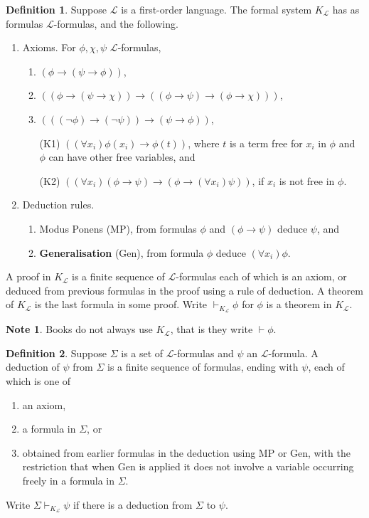\documentclass{article}
\newcommand{\rb}[1]{\left( #1 \right)}
\newcommand{\notb}[1]{\rb{\neg #1}}
\newcommand{\impb}[2]{\rb{#1 \rightarrow #2}}
\newcommand{\fab}[1]{\rb{\forall #1}}
\theoremstyle{definition}\newtheorem{definition}{Definition}[subsection]
\theoremstyle{definition}\newtheorem{remark}[definition]{Remark}
\theoremstyle{definition}\newtheorem*{example}{Example}
\theoremstyle{definition}\newtheorem*{note}{Note}
\begin{document}
\begin{definition}
Suppose $ \mathcal{L} $ is a first-order language. The formal system \textbf{$ K_\mathcal{L} $} has as formulas $ \mathcal{L} $-formulas, and the following.
\begin{enumerate}
\item Axioms. For $ \phi, \chi, \psi $ $ \mathcal{L} $-formulas,
\begin{enumerate}[label=(A\arabic*)]
\item $ \impb{\phi}{\impb{\psi}{\phi}} $,
\item $ \impb{\impb{\phi}{\impb{\psi}{\chi}}}{\impb{\impb{\phi}{\psi}}{\impb{\phi}{\chi}}} $,
\item $ \impb{\impb{\notb{\phi}}{\notb{\psi}}}{\impb{\psi}{\phi}} $,
\item[(K1)] $ \impb{\fab{x_i}\phi\rb{x_i}}{\phi\rb{t}} $, where $ t $ is a term free for $ x_i $ in $ \phi $ and $ \phi $ can have other free variables, and
\item[(K2)] $ \impb{\fab{x_i}\impb{\phi}{\psi}}{\impb{\phi}{\fab{x_i}\psi}} $, if $ x_i $ is not free in $ \phi $.
\end{enumerate}
\item Deduction rules.
\begin{enumerate}
\item Modus Ponens (MP), from formulas $ \phi $ and $ \impb{\phi}{\psi} $ deduce $ \psi $, and
\item \textbf{Generalisation} (Gen), from formula $ \phi $ deduce $ \fab{x_i}\phi $.
\end{enumerate}
\end{enumerate}
A proof in $ K_\mathcal{L} $ is a finite sequence of $ \mathcal{L} $-formulas each of which is an axiom, or deduced from previous formulas in the proof using a rule of deduction. A theorem of $ K_\mathcal{L} $ is the last formula in some proof. Write $ \vdash_{K_\mathcal{L}} \phi $ for $ \phi $ is a theorem in $ K_\mathcal{L} $.
\end{definition}

\begin{note}
Books do not always use $ K_\mathcal{L} $, that is they write $ \vdash \phi $.
\end{note}

\begin{definition}
Suppose $ \Sigma $ is a set of $ \mathcal{L} $-formulas and $ \psi $ an $ \mathcal{L} $-formula. A deduction of $ \psi $ from $ \Sigma $ is a finite sequence of formulas, ending with $ \psi $, each of which is one of
\begin{enumerate}
\item an axiom,
\item a formula in $ \Sigma $, or
\item obtained from earlier formulas in the deduction using MP or Gen, with the restriction that when Gen is applied it does not involve a variable occurring freely in a formula in $ \Sigma $.
\end{enumerate}
Write $ \Sigma \vdash_{K_\mathcal{L}} \psi $ if there is a deduction from $ \Sigma $ to $ \psi $.
\end{definition}
\end{document}
